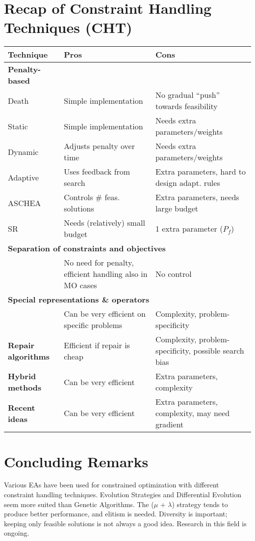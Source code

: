 \section{Recap of Constraint Handling Techniques (CHT)}

\begin{center}
    \begin{tabular}{|l|l|l|}
    \hline
    \textbf{Technique} & \textbf{Pros} & \textbf{Cons} \\
    \hline
    \textbf{Penalty-based} & & \\
    \hline
    Death & Simple implementation & No gradual “push” towards feasibility\\
    \hline
    Static & Simple implementation & Needs extra parameters/weights\\
    \hline
    Dynamic & Adjusts penalty over time & Needs extra parameters/weights\\
    \hline
    Adaptive & Uses feedback from search & Extra parameters, hard to design adapt. rules\\
    \hline
    ASCHEA & Controls \# feas. solutions & Extra parameters, needs large budget\\
    \hline
    SR & Needs (relatively) small budget & 1 extra parameter (\(P_f\))\\
    \hline
    \multicolumn{3}{|l|}{\textbf{Separation of constraints and objectives}} \\
    \hline
    & No need for penalty, efficient handling also in MO cases & No control\\
    \hline
    \multicolumn{3}{|l|}{\textbf{Special representations \& operators}} \\
    \hline
    & Can be very efficient on specific problems & Complexity, problem-specificity\\
    \hline
    \textbf{Repair algorithms} & Efficient if repair is cheap & Complexity, problem-specificity, possible search bias\\
    \hline
    \textbf{Hybrid methods} & Can be very efficient & Extra parameters, complexity\\
    \hline
    \textbf{Recent ideas} & Can be very efficient & Extra parameters, complexity, may need gradient\\
    \hline
    \end{tabular}
    \end{center}

\section{Concluding Remarks}

Various EAs have been used for constrained optimization with different constraint handling techniques. Evolution Strategies and Differential Evolution seem more suited than Genetic Algorithms. The (\(\mu\) + \(\lambda\)) strategy tends to produce better performance, and elitism is needed. Diversity is important; keeping only feasible solutions is not always a good idea. Research in this field is ongoing.
